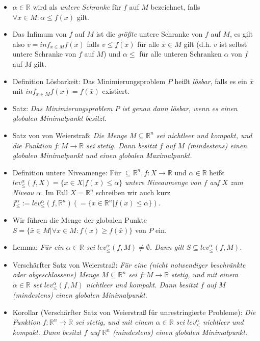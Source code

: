 \documentclass[paper=a4, fontsize=11pt]{scrartcl} %
\numberwithin{equation}{section} %
\numberwithin{figure}{section} %
\numberwithin{table}{section} %
\begin{document}
\begin{itemize}
\item $\alpha \in \mathbb{R}$ wird als \textit{untere Schranke} für $f$ auf $M$ bezeichnet, falls $\forall x \in M: \alpha \le f(x)$ gilt.
\item Das Infimum von $f$ auf $M$ ist die \textit{größte} untere Schranke von $f$ auf $M$, es gilt also $v = inf_{x \in M} f(x)$ falls $v \le f(x)$ für alle $x \in M$ gilt (d.h. $v$ ist selbst untere Schranke von $f$ auf $M$) und $\alpha \le$ für alle unteren Schranken $\alpha$ von $f$ auf $M$ gilt.
\item Definition Lösbarkeit: Das Minimierungsproblem $P$ heißt \textit{lösbar}, falls es ein $\bar{x}$ mit $inf_{x \in M} f(x) = f(\bar{x})$ existiert.
\item Satz: \textit{Das Minimierungsproblem $P$ ist genau dann lösbar, wenn es einen globalen Minimalpunkt besitzt.}
\item Satz von von Weierstraß: \textit{Die Menge $M \subseteq \mathbb{R}^n$ sei nichtleer und kompakt, und die Funktion $f: M \rightarrow \mathbb{R}$ sei stetig. Dann besitzt $f$ auf $M$ (mindestens) einen globalen Minimalpunkt und einen globalen Maximalpunkt.}
\item Definition untere Niveamenge: Für $ \subseteq \mathbb{R}^n, f:X \rightarrow \mathbb{R}$ und $\alpha \in \mathbb{R}$ heißt $lev^\alpha_\le(f,X) = \{ x \in X | f(x) \le \alpha \} $ \textit{untere Niveaumenge von $f$ auf $X$ zum Niveau $\alpha$}. Im Fall $X = \mathbb{R}^n$ schreiben wir auch kurz $f^\alpha_\le := lev^\alpha_\le (f,\mathbb{R}^n) ( = \{ x \in \mathbb{R}^n | f(x) \le \alpha \} )$.
\item Wir führen die Menge der globalen Punkte $S = \{ \bar{x} \in M | \forall x \in M: f(x) \ge f(\bar{x}) \}$ von $P$ ein.
\item Lemma: \textit{Für ein $\alpha \in \mathbb{R}$ sei $lev^\alpha_\le (f,M) \neq \emptyset$. Dann gilt $S \subseteq lev^\alpha_\le (f,M)$.}
\item Verschärfter Satz von Weierstraß: \textit{Für eine (nicht notwendiger beschränkte oder abgeschlossene) Menge $M \subseteq \mathbb{R}^n$ sei $f: M \rightarrow \mathbb{R}$ stetig, und mit einem $\alpha \in \mathbb{R}$ set $lev^\alpha_\le(f,M)$ nichtleer und kompakt. Dann besitzt $f$ auf $M$ (mindestens) einen globalen Minimalpunkt.}
\item Korollar (Verschärfter Satz von Weierstraß für unrestringierte Probleme): \textit{Die Funktion $f: \mathbb{R}^n \rightarrow \mathbb{R}$ sei stetig, und mit einem $\alpha \in \mathbb{R}$ sei $lev^\alpha_\le$ nichtleer und kompakt. Dann besitzt $f$ auf $\mathbb{R}^n$ (mindestens) einen globalen Minimalpunkt.}

\end{itemize}
\end{document}
